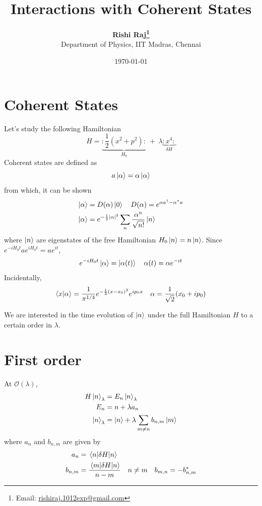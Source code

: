 \documentclass[a4paper, 12pt, fleqn]{article}
\title{Interactions with Coherent States}
\author{
  {\bfseries Rishi Raj\protect\footnote{Email: \href{mailto:rishiraj.1012exp@gmail.com}{rishiraj.1012exp@gmail.com}}} \\ Department of Physics, IIT Madras, Chennai
}
\date{\today}
\newcommand{\normord}[1]{:\mathrel{#1}:}
\begin{document}
  \maketitle

  \tableofcontents
  

  \section{Coherent States}

  Let's study the following Hamiltonian
  \begin{equation}
    H = \underbrace{\normord{ \frac{1}{2} \left( x^2 + p^2 \right) }}_{H_0} \ + \ \lambda \underbrace{\normord{x^4}}_{\delta H}
  \end{equation}
  Coherent states are defined as
  \begin{equation}
    a \ket{\alpha} = \alpha \ket{\alpha}
  \end{equation}
  from which, it can be shown
  \begin{align}
    \ket{\alpha} &= D(\alpha) \ket{0} \quad D(\alpha) = e^{\alpha a^{\dagger} - \alpha^* a} \\
    \ket{\alpha} &= e^{-\frac{1}{2} \abs{\alpha}^2} \sum_{n} \frac{\alpha^n}{\sqrt{n!}} \ket{n}
  \end{align}
  where $\ket{n}$ are eigenstates of the free Hamiltonian $H_0 \ket{n} = n \ket{n}$. Since $e^{-i H_0 t} a e^{i H_0 t} = a e^{i t}$,
  \begin{equation}
    e^{-i H_0 t} \ket{\alpha} = \ket{\alpha(t)} \quad \alpha(t) = \alpha e^{-it}
  \end{equation}
  Incidentally,
  \begin{equation}
    \braket{x}{\alpha} = \frac{1}{\pi^{1/4}} e^{-\frac{1}{2}(x - x_0)^2} e^{i p_0 x} \quad \alpha = \frac{1}{\sqrt{2}} (x_0 + i p_0)
  \end{equation}

  We are interested in the time evolution of $\ket{\alpha}$ under the full Hamiltonian $H$ to a certain order in $\lambda$.

  \section{First order}
  At $\mathcal{O}(\lambda)$,
  \begin{align}
    H \ket{n}_{\lambda} &= E_n \ket{n}_{\lambda} \\
    E_n &= n + \lambda a_n \\
    \ket{n}_{\lambda} &= \ket{n} + \lambda \sum_{m \neq n} b_{n, m} \ket{m}
  \end{align}
  where $a_n$ and $b_{n, m}$ are given by
  \begin{align}
    a_n &= \mel{n}{\delta H}{n} \\
    b_{n, m} &= \frac{\mel{m}{\delta H}{n}}{n - m} \quad n \neq m \quad b_{m, n} = -b_{n, m}^{*}
  \end{align}
  
\end{document}
